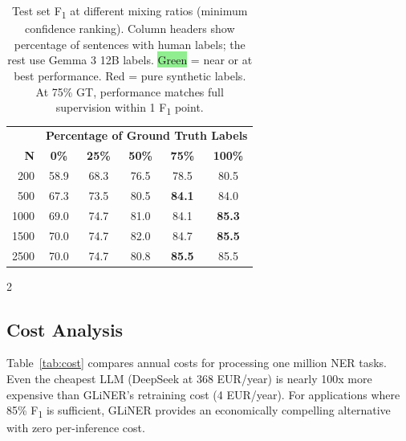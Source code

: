 \documentclass[11pt]{article}
\newcommand{\fone}{F\textsubscript{1}}
\begin{document}
\begin{table}[H]
    \centering
    \small
    \begin{tabular}{r c c c c c}
        \toprule
        \rowcolor{headerblue!15}
        & \multicolumn{5}{c}{\textbf{Percentage of Ground Truth Labels}} \\
        \rowcolor{headerblue!15}
        \textbf{N} & \textbf{0\%} & \textbf{25\%} & \textbf{50\%} & \textbf{75\%} & \textbf{100\%} \\
        \midrule
        200 & \cellcolor{lightred!40}58.9 & 68.3 & 76.5 & \cellcolor{lightgreen!60}78.5 & \cellcolor{lightgreen}80.5 \\
        500 & \cellcolor{lightred!40}67.3 & 73.5 & 80.5 & \cellcolor{lightgreen}\textbf{84.1} & \cellcolor{lightgreen}84.0 \\
        1000 & \cellcolor{lightred!40}69.0 & 74.7 & 81.0 & \cellcolor{lightgreen!60}84.1 & \cellcolor{lightgreen}\textbf{85.3} \\
        1500 & \cellcolor{lightred!40}70.0 & 74.7 & 82.0 & \cellcolor{lightgreen!60}84.7 & \cellcolor{lightgreen}\textbf{85.5} \\
        2500 & \cellcolor{lightred!40}70.0 & 74.7 & 80.8 & \cellcolor{lightgreen}\textbf{85.5} & \cellcolor{lightgreen}85.5 \\
        \bottomrule
    \end{tabular}
    \caption{Test set \fone{} at different mixing ratios (minimum confidence ranking). Column headers show percentage of sentences with human labels; the rest use Gemma 3 12B labels. \colorbox{lightgreen}{Green} = near or at best performance. \colorbox{lightred!40}{Red} = pure synthetic labels. At 75\% GT, performance matches full supervision within 1 \fone{} point.}
    \label{tab:mixing}
\end{table}

\begin{multicols}{2}

\subsection{Cost Analysis}

Table~\ref{tab:cost} compares annual costs for processing one million NER tasks. Even the cheapest LLM (DeepSeek at 368 EUR/year) is nearly 100x more expensive than GLiNER's retraining cost (4 EUR/year). For applications where 85\% \fone{} is sufficient, GLiNER provides an economically compelling alternative with zero per-inference cost.

\end{multicols}
\end{document}
